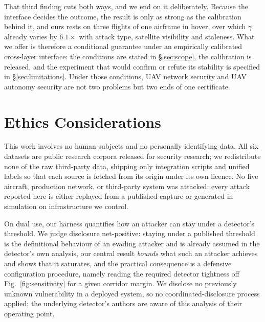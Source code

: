 That third finding cuts both ways, and we end on it deliberately. Because the
interface decides the outcome, the result is only as strong as the calibration
behind it, and ours rests on three flights of one airframe in hover, over which
$\gamma$ already varies by $6.1\times$ with attack type, satellite visibility
and staleness. What we offer is
therefore a conditional guarantee under an empirically calibrated cross-layer
interface: the conditions are stated in \S\ref{sec:scope}, the calibration is
released, and the experiment that would confirm or refute its stability is
specified in \S\ref{sec:limitations}. Under those conditions, UAV network
security and UAV autonomy security are not two problems but two ends of one
certificate.

\section{Ethics Considerations}
\label{sec:ethics}
This work involves no human subjects and no personally identifying data. All six
datasets are public research corpora released for security research; we
redistribute none of the raw third-party data, shipping only integration scripts
and unified labels so that each source is fetched from its origin under its own
licence. No live aircraft, production network, or third-party system was
attacked: every attack reported here is either replayed from a published capture
or generated in simulation on infrastructure we control.

On dual use, our harness quantifies how an attacker can stay under a detector's
threshold. We judge disclosure net-positive: staying under a published threshold
is the definitional behaviour of an evading attacker and is already assumed in
the detector's own analysis, our central result \emph{bounds} what such an
attacker achieves and shows that it saturates, and the practical consequence is
a defensive configuration procedure, namely reading the required detector
tightness off Fig.~\ref{fig:sensitivity} for a given corridor margin. We
disclose no previously unknown vulnerability in a deployed system, so no
coordinated-disclosure process applied; the underlying detector's authors are
aware of this analysis of their operating point.

